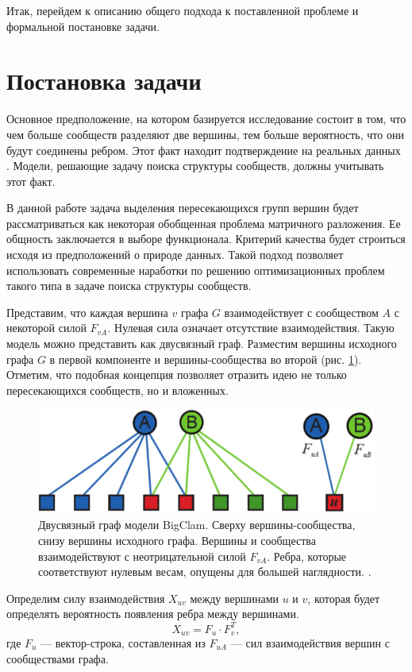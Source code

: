 \documentclass{ITaSconf}
\begin{document}
	Итак, перейдем к описанию общего подхода к поставленной проблеме и формальной постановке задачи.
	
	\section{Постановка задачи}
	
	Основное предположение, на котором базируется исследование состоит в том, что чем больше сообществ разделяют две вершины, тем больше вероятность, что они будут соединены ребром. Этот факт находит подтверждение на реальных данных \cite{yang2013overlapping}. Модели, решающие задачу поиска структуры сообществ, должны учитывать этот факт.
	
	В данной работе задача выделения пересекающихся групп вершин будет рассматриваться как некоторая обобщенная проблема матричного разложения. Ее общность заключается в выборе функционала. Критерий качества будет строиться исходя из предположений о природе данных. Такой подход позволяет использовать современные наработки по решению оптимизационных проблем такого типа в задаче поиска структуры сообществ.
	
	Представим, что каждая вершина $v$ графа $G$ взаимодействует с сообществом $A$ с некоторой силой $F_{vA}$. Нулевая сила означает отсутствие взаимодействия. Такую модель можно представить как двусвязный граф. Разместим вершины исходного графа $G$ в первой компоненте и вершины-сообщества во второй (рис. \ref{fig:AGM}). Отметим, что подобная концепция позволяет отразить идею не только пересекающихся сообществ, но и вложенных.
	\begin{figure}[!ht]
		\centering
		\includegraphics[width=\linewidth]{imgs/BigCLAM_model.png}
		\caption{Двусвязный граф модели BigClam. Сверху вершины-сообщества, снизу вершины исходного графа. Вершины и сообщества взаимодействуют с неотрицательной силой $F_{vA}$. Ребра, которые соответствуют нулевым весам, опущены для большей наглядности. \cite{yang2013overlapping}.}
		\label{fig:AGM}
	\end{figure}
	Определим силу взаимодействия $X_{uv}$ между вершинами $u$ и $v$, которая будет определять вероятность появления ребра между вершинами.
	$$X_{uv} = F_{u} \cdot F_{v}^T,$$
	где $F_{u}$ --- вектор-строка, составленная из $F_{uA}$ --- сил взаимодействия вершин с сообществами графа.
	
\end{document}
